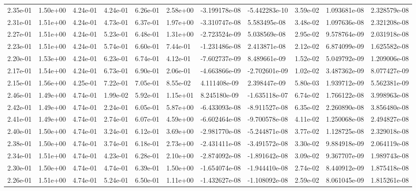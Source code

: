 \begin{longtable}{| p{} | p{} |}
2.35e-01 & 1.50e+00 & 4.24e-01 & 4.24e-01 & 6.26e-01 & 2.58e+00 & -3.199178e-08 & -5.442283e-10 &  3.59e-02 &  1.093681e-08 &  2.328579e-08 \\
2.31e-01 & 1.51e+00 & 4.24e-01 & 4.73e-01 & 6.37e-01 & 1.97e+00 & -3.310747e-08 &  5.583495e-08 &  3.48e-02 &  1.097636e-08 &  2.321208e-08 \\
2.27e-01 & 1.51e+00 & 4.24e-01 & 5.23e-01 & 6.48e-01 & 1.31e+00 & -2.723524e-09 &  5.038569e-08 &  2.95e-02 &  9.578764e-09 &  2.031918e-08 \\
2.23e-01 & 1.51e+00 & 4.24e-01 & 5.74e-01 & 6.60e-01 & 7.44e-01 & -1.231486e-08 &  2.413871e-08 &  2.12e-02 &  6.874099e-09 &  1.625582e-08 \\
2.20e-01 & 1.53e+00 & 4.24e-01 & 6.23e-01 & 6.74e-01 & 4.12e-01 & -7.602737e-09 &  8.489661e-09 &  1.52e-02 &  5.049792e-09 &  1.209006e-08 \\
2.17e-01 & 1.54e+00 & 4.24e-01 & 6.73e-01 & 6.90e-01 & 2.06e-01 & -4.663866e-09 & -2.702601e-09 &  1.02e-02 &  3.487362e-09 &  8.077427e-09 \\
2.15e-01 & 1.56e+00 & 4.25e-01 & 7.22e-01 & 7.05e-01 & 8.55e-02 &  4.111408e-09 &  2.398447e-09 &  5.80e-03 &  1.939712e-09 &  5.562381e-09 \\
2.46e-01 & 1.49e+00 & 4.74e-01 & 1.99e-02 & 5.92e-01 & 1.15e+01 &  8.245180e-09 & -1.635118e-07 &  6.74e-02 &  1.766122e-08 &  3.998963e-08 \\
2.42e-01 & 1.49e+00 & 4.74e-01 & 2.24e-01 & 6.05e-01 & 5.87e+00 & -6.433093e-08 & -8.911527e-08 &  6.35e-02 &  2.260890e-08 &  3.856480e-08 \\
2.41e-01 & 1.49e+00 & 4.74e-01 & 2.74e-01 & 6.07e-01 & 4.59e+00 & -6.602464e-08 & -9.700578e-08 &  4.11e-02 &  1.250068e-08 &  2.494827e-08 \\
2.40e-01 & 1.50e+00 & 4.74e-01 & 3.24e-01 & 6.12e-01 & 3.69e+00 & -2.981770e-08 & -5.244871e-08 &  3.77e-02 &  1.128725e-08 &  2.329018e-08 \\
2.38e-01 & 1.50e+00 & 4.74e-01 & 3.74e-01 & 6.18e-01 & 2.73e+00 & -2.431411e-08 & -3.491572e-08 &  3.30e-02 &  9.884918e-09 &  2.064119e-08 \\
2.34e-01 & 1.51e+00 & 4.74e-01 & 4.23e-01 & 6.28e-01 & 2.10e+00 & -2.874092e-08 & -1.891642e-08 &  3.09e-02 &  9.367707e-09 &  1.989743e-08 \\
2.30e-01 & 1.50e+00 & 4.74e-01 & 4.74e-01 & 6.39e-01 & 1.50e+00 & -1.654074e-08 & -1.944410e-08 &  2.74e-02 &  8.440912e-09 &  1.875418e-08 \\
2.26e-01 & 1.51e+00 & 4.74e-01 & 5.24e-01 & 6.50e-01 & 1.11e+00 & -1.432627e-08 & -1.108092e-08 &  2.59e-02 &  8.061045e-09 &  1.815261e-08 \\

\end{longtable}
